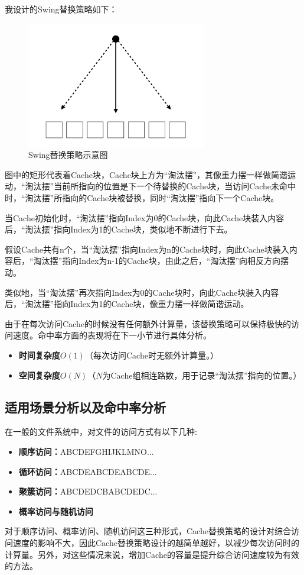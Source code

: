 \documentclass{article}
\begin{document}
我设计的Swing替换策略如下：

\begin{figure}[H]
    \centering
    \includegraphics[width=0.7\textwidth]{pic1.png}
    \caption{Swing替换策略示意图}
\end{figure}

图中的矩形代表着Cache块，Cache块上方为“淘汰摆”，其像重力摆一样做简谐运动，“淘汰摆”当前所指向的位置是下一个待替换的Cache块，当访问Cache未命中时，“淘汰摆”所指向的Cache块被替换，同时“淘汰摆”指向下一个Cache块。

当Cache初始化时，“淘汰摆”指向Index为0的Cache块，向此Cache块装入内容后，“淘汰摆”指向Index为1的Cache块，类似地不断进行下去。

假设Cache共有n个，当“淘汰摆”指向Index为n的Cache块时，向此Cache块装入内容后，“淘汰摆”指向Index为n-1的Cache块，由此之后，“淘汰摆”向相反方向摆动。

类似地，当“淘汰摆”再次指向Index为0的Cache块时，向此Cache块装入内容后，“淘汰摆”指向Index为1的Cache块，像重力摆一样做简谐运动。

由于在每次访问Cache的时候没有任何额外计算量，该替换策略可以保持极快的访问速度。命中率方面的表现将在下一小节进行具体分析。


\begin{itemize}
\item{\textbf{时间复杂度$O(1)$}（每次访问Cache时无额外计算量。）}
\item{\textbf{空间复杂度$O(N)$}（$N$为Cache组相连路数，用于记录“淘汰摆”指向的位置。）}
\end{itemize}

\subsection{适用场景分析以及命中率分析}
在一般的文件系统中，对文件的访问方式有以下几种:
\begin{itemize}
\item{\textbf{顺序访问：}ABCDEFGHIJKLMNO...}
\item{\textbf{循环访问：}ABCDEABCDEABCDE...}
\item{\textbf{聚簇访问：}ABCDEDCBABCDEDC...}
\item{\textbf{概率访问与随机访问}}
\end{itemize}
对于顺序访问、概率访问、随机访问这三种形式，Cache替换策略的设计对综合访问速度的影响不大，因此Cache替换策略设计的越简单越好，以减少每次访问时的计算量。另外，对这些情况来说，增加Cache的容量是提升综合访问速度较为有效的方法。
\end{document}
